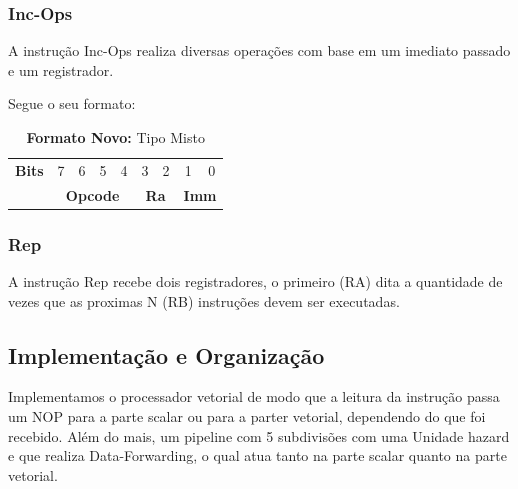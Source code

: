 \documentclass{article}
\begin{document}
    \subsubsection{Inc-Ops}

    A instrução Inc-Ops realiza diversas operações com base em um imediato passado e um registrador.

    Segue o seu formato:

    \begin{table}[h]
      \captionsetup{labelformat=empty, skip=0pt}
      \caption{\textbf{Formato Novo:} Tipo Misto}
      \centering
      \begin{tabular}{|c|*{8}{c|}}
        \hline
        \rowcolor{red!50}
        \multicolumn{9}{|c|}{\textbf{Tipo M}} \\ \hline
        \textbf{Bits} & 7 & 6 & 5 & 4 & 3 & 2 & 1 & 0 \\ \hline
        & \multicolumn{4}{c|}{\textbf{Opcode}} & \multicolumn{2}{c|}{\textbf{Ra}} & \multicolumn{2}{c|}{\textbf{Imm}} \\ \hline
      \end{tabular}
    \end{table}

    \subsubsection{Rep}
    
    A instrução Rep recebe dois registradores, o primeiro (RA) dita a quantidade de vezes que as proximas N (RB) instruções devem ser executadas.
    
    \subsection{Implementação e Organização}

    Implementamos o processador vetorial de modo que a leitura da instrução passa um NOP para a parte scalar ou para a parter vetorial, dependendo do que foi recebido. 
    Além do mais, um pipeline com 5 subdivisões com uma Unidade hazard e que realiza Data-Forwarding, o qual atua tanto na parte scalar quanto na parte vetorial.
\end{document}
